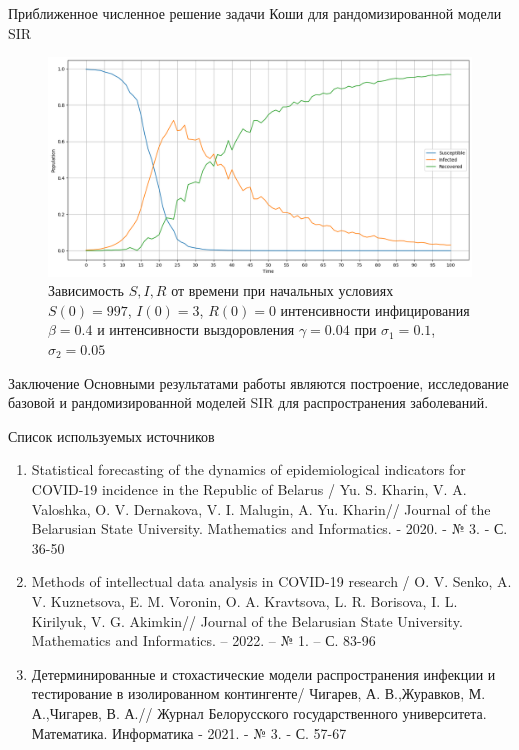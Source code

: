 \documentclass[notheorems]{beamer}
\begin{document}

\begin{frame}
	{Приближенное численное решение задачи Коши для рандомизированной модели SIR}
	\begin{figure}[h]
		\centering
		\includegraphics[scale=0.3]{images/img04}
		\caption{Зависимость $S, I, R$ от времени при начальных условиях $S(0) = 997$, $I(0) = 3$, $R(0) = 0$
			интенсивности инфицирования $\beta = 0.4$ и интенсивности выздоровления $\gamma = 0.04$ при $\sigma_1 = 0.1$, $\sigma_2 = 0.05$}
		\label{fig:img04}
	\end{figure}
\end{frame}


\begin{frame}
	{Заключение}
	Основными результатами работы являются построение, исследование базовой и рандомизированной моделей SIR для распространения заболеваний. 
\end{frame}


\begin{frame}
	{Список используемых источников}
	\begin{enumerate}
		\item Statistical forecasting of the dynamics of epidemiological indicators for COVID-19 incidence in the Republic of Belarus / Yu. S. Kharin, V. A. Valoshka, O. V. Dernakova, V. I. Malugin, A. Yu. Kharin// Journal of the Belarusian State University. Mathematics and Informatics. - 2020. - № 3. - С. 36-50
		\item Methods of intellectual data analysis in COVID-19 research / O. V. Senko, A. V. Kuznetsova, E. M. Voronin, O. A. Kravtsova, L. R. Borisova, I. L. Kirilyuk, V. G. Akimkin// Journal of the Belarusian State University. Mathematics and Informatics. – 2022. – № 1. – С. 83-96
		\item Детерминированные и стохастические модели распространения инфекции и тестирование в изолированном контингенте/ Чигарев, А. В.,Журавков, М. А.,Чигарев, В. А.// Журнал Белорусского государственного университета. Математика. Информатика - 2021. - № 3. - С. 57-67
	\end{enumerate}
\end{frame}

\end{document}

